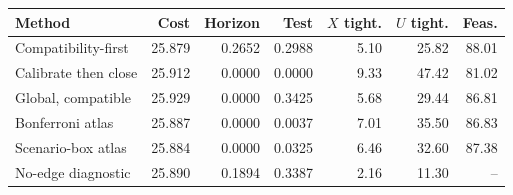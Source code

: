 \begin{tabular}{lrrrrrr}
\toprule
Method & Cost & Horizon & Test & $X$ tight. & $U$ tight. & Feas. \\
\midrule
Compatibility-first & 25.879 & 0.2652 & 0.2988 & 5.10 & 25.82 & 88.01 \\
Calibrate then close & 25.912 & 0.0000 & 0.0000 & 9.33 & 47.42 & 81.02 \\
Global, compatible & 25.929 & 0.0000 & 0.3425 & 5.68 & 29.44 & 86.81 \\
Bonferroni atlas & 25.887 & 0.0000 & 0.0037 & 7.01 & 35.50 & 86.83 \\
Scenario-box atlas & 25.884 & 0.0000 & 0.0325 & 6.46 & 32.60 & 87.38 \\
No-edge diagnostic & 25.890 & 0.1894 & 0.3387 & 2.16 & 11.30 & -- \\
\bottomrule
\end{tabular}
